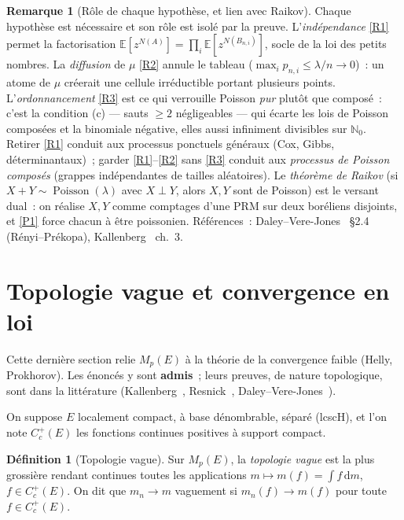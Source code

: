 \documentclass[11pt,a4paper]{article}
\theoremstyle{plain}
\theoremstyle{definition}
\newtheorem{definition}[theoreme]{Définition}
\newtheorem{remarque}[theoreme]{Remarque}
\newcommand{\N}{\mathbb{N}}
\newcommand{\E}{\mathbb{E}}
\newcommand{\Poi}{\operatorname{Poisson}}
\newcommand{\Mp}{M_p}
\newcommand{\dd}{\,\mathrm{d}}
\begin{document}
\begin{remarque}[Rôle de chaque hypothèse, et lien avec Raikov]\label{rem:renyi-hyp}
Chaque hypothèse est nécessaire et son rôle est isolé par la preuve. L'\emph{indépendance} \ref{R1} permet la factorisation $\E[z^{N(A)}]=\prod_i\E[z^{N(B_{n,i})}]$, socle de la loi des petits nombres. La \emph{diffusion} de $\mu$ \ref{R2} annule le tableau ($\max_i p_{n,i}\le\lambda/n\to0$)~: un atome de $\mu$ créerait une cellule irréductible portant plusieurs points. L'\emph{ordonnancement} \ref{R3} est ce qui verrouille Poisson \emph{pur} plutôt que composé~: c'est la condition (c) --- sauts $\ge2$ négligeables --- qui écarte les lois de Poisson composées et la binomiale négative, elles aussi infiniment divisibles sur $\N_0$. Retirer \ref{R1} conduit aux processus ponctuels généraux (Cox, Gibbs, déterminantaux)~; garder \ref{R1}--\ref{R2} sans \ref{R3} conduit aux \emph{processus de Poisson composés} (grappes indépendantes de tailles aléatoires). Le \emph{théorème de Raikov} (si $X+Y\sim\Poi(\lambda)$ avec $X\perp Y$, alors $X,Y$ sont de Poisson) est le versant dual~: on réalise $X,Y$ comme comptages d'une $\mathrm{PRM}$ sur deux boréliens disjoints, et \ref{P1} force chacun à être poissonien. Références~: Daley--Vere-Jones~\cite{DVJ} \S2.4 (Rényi--Prékopa), Kallenberg~\cite{Kallenberg} ch.~3.
\end{remarque}

\section{Topologie vague et convergence en loi}\label{sec:vague}

Cette dernière section relie $\Mp(E)$ à la théorie de la convergence faible (Helly, Prokhorov). Les énoncés y sont \textbf{admis}~; leurs preuves, de nature topologique, sont dans la littérature (Kallenberg~\cite{Kallenberg}, Resnick~\cite{Resnick}, Daley--Vere-Jones~\cite{DVJ}).

On suppose $E$ localement compact, à base dénombrable, séparé (lcscH), et l'on note $C_c^+(E)$ les fonctions continues positives à support compact.

\begin{definition}[Topologie vague]
Sur $\Mp(E)$, la \emph{topologie vague} est la plus grossière rendant continues toutes les applications $m\mapsto m(f)=\int f\dd m$, $f\in C_c^+(E)$. On dit que $m_n\to m$ vaguement si $m_n(f)\to m(f)$ pour toute $f\in C_c^+(E)$.
\end{definition}
\end{document}
